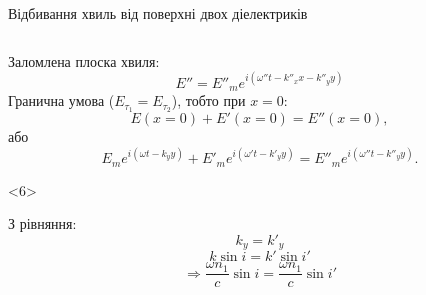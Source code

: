\documentclass[onlytextwidth]{beamer}
\begin{document}
\begin{frame}[t]{Відбивання хвиль від поверхні двох діелектриків}
\begin{columns}
\begin{column}{0.5\linewidth}
{\begin{block}{}
					Заломлена плоска хвиля:
					\begin{equation*}
						E'' = E''_m e^{i(\omega'' t - k''_xx-k''_yy)}
					\end{equation*}
					Гранична умова ($E_{\tau_1} = E_{\tau_2}$), тобто при $x = 0$:
					\begin{equation*}
						E(x=0) + E'(x=0) = E''(x=0),
					\end{equation*}
					або
					\begin{equation*}
						E_m e^{i(\omega t -k_yy)} + E'_m e^{i(\omega' t - k'_yy)} =E''_m e^{i(\omega'' t - k''_yy)}.
					\end{equation*}
				\end{block}
			}
			\begin{onlyenv}<6>
				\begin{block}{}\justifying
					З рівняння:
					\begin{equation*}
						k_y = k'_y
					\end{equation*}
					\begin{equation*}
						k\sin i = k'\sin i'
					\end{equation*}
					\begin{equation*}
						\Rightarrow \frac{\omega n_1}{c} \sin i = \frac{\omega n_1}{c} \sin i'

\end{equation*}
\end{block}
\end{onlyenv}
\end{column}
\end{columns}
\end{frame}
\end{document}
